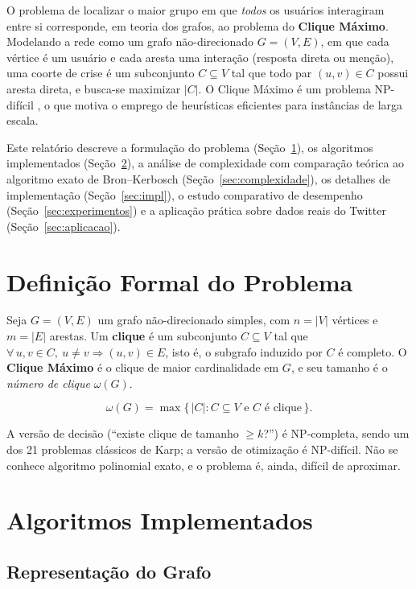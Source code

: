 \documentclass[12pt]{article}
\begin{document}
O problema de localizar o maior grupo em que \emph{todos} os usuários
interagiram entre si corresponde, em teoria dos grafos, ao problema do
\textbf{Clique Máximo}. Modelando a rede como um grafo não-direcionado
$G = (V, E)$, em que cada vértice é um usuário e cada aresta uma interação
(resposta direta ou menção), uma coorte de crise é um subconjunto
$C \subseteq V$ tal que todo par $(u, v) \in C$ possui aresta direta, e busca-se
maximizar $|C|$. O Clique Máximo é um problema NP-difícil
\cite{garey1979}, o que motiva o emprego de heurísticas eficientes para
instâncias de larga escala.

Este relatório descreve a formulação do problema (Seção~\ref{sec:problema}), os
algoritmos implementados (Seção~\ref{sec:algoritmos}), a análise de complexidade
com comparação teórica ao algoritmo exato de Bron--Kerbosch
(Seção~\ref{sec:complexidade}), os detalhes de implementação
(Seção~\ref{sec:impl}), o estudo comparativo de desempenho
(Seção~\ref{sec:experimentos}) e a aplicação prática sobre dados reais do
Twitter (Seção~\ref{sec:aplicacao}).

\section{Definição Formal do Problema}
\label{sec:problema}

Seja $G = (V, E)$ um grafo não-direcionado simples, com $n = |V|$ vértices e
$m = |E|$ arestas. Um \textbf{clique} é um subconjunto $C \subseteq V$ tal que
$\forall\, u, v \in C,\ u \neq v \Rightarrow (u, v) \in E$, isto é, o subgrafo
induzido por $C$ é completo. O \textbf{Clique Máximo} é o clique de maior
cardinalidade em $G$, e seu tamanho é o \emph{número de clique} $\omega(G)$.

\begin{equation}
\omega(G) = \max\{\, |C| : C \subseteq V \text{ e } C \text{ é clique} \,\}.
\end{equation}

A versão de decisão (``existe clique de tamanho $\geq k$?'') é NP-completa,
sendo um dos 21 problemas clássicos de Karp; a versão de otimização é
NP-difícil. Não se conhece algoritmo polinomial exato, e o problema é, ainda,
difícil de aproximar.

\section{Algoritmos Implementados}
\label{sec:algoritmos}

\subsection{Representação do Grafo}
\end{document}
